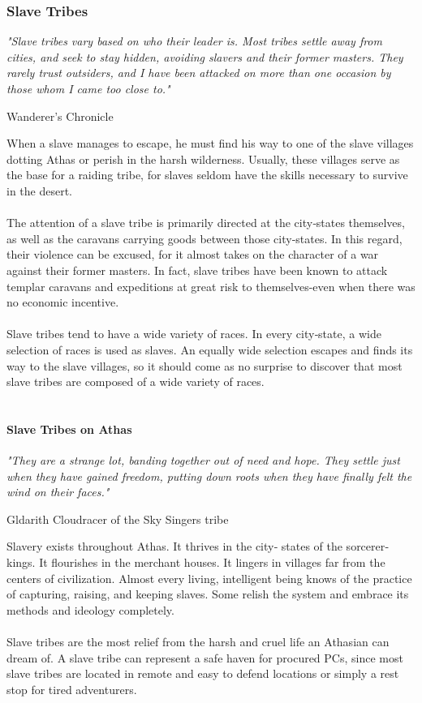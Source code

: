 \begin{multicols}{2}
\subsubsection{Slave Tribes}
\epigraph{\textit{
"Slave tribes vary based on who their leader is. Most tribes
settle away from cities, and seek to stay hidden, avoiding
slavers and their former masters. They rarely trust
outsiders, and I have been attacked on more than one
occasion by those whom I came too close to." }}
{ Wanderer's Chronicle }

When a slave manages to escape, he must find his way
to one of the slave villages dotting Athas or perish in the
harsh wilderness. Usually, these villages serve as the base
for a raiding tribe, for slaves seldom have the skills
necessary to survive in the desert.\\
\\
The attention of a slave tribe is primarily directed at
the city‐states themselves, as well as the caravans carrying
goods between those city‐states. In this regard, their
violence can be excused, for it almost takes on the
character of a war against their former masters. In fact,
slave tribes have been known to attack templar caravans
and expeditions at great risk to themselves-even when
there was no economic incentive.\\
\\
Slave tribes tend to have a wide variety of races. In
every city‐state, a wide selection of races is used as slaves.
An equally wide selection escapes and finds its way to the
slave villages, so it should come as no surprise to discover
that most slave tribes are composed of a wide variety of
races.\\
\\
\paragraph{Slave Tribes on Athas}
\epigraph{\textit{
"They are a strange lot, banding together out of need and
hope. They settle just when they have gained freedom,
putting down roots when they have finally felt the wind on
their faces." }}
{ Gldarith Cloudracer of the Sky Singers tribe }

Slavery exists throughout Athas. It thrives in the city‐
states of the sorcerer‐kings. It flourishes in the merchant
houses. It lingers in villages far from the centers of
civilization. Almost every living, intelligent being knows
of the practice of capturing, raising, and keeping slaves.
Some relish the system and embrace its methods and
ideology completely.\\
\\
Slave tribes are the most relief from the harsh and
cruel life an Athasian can dream of. A slave tribe can
represent a safe haven for procured PCs, since most slave
tribes are located in remote and easy to defend locations
or simply a rest stop for tired adventurers.


\end{multicols}
